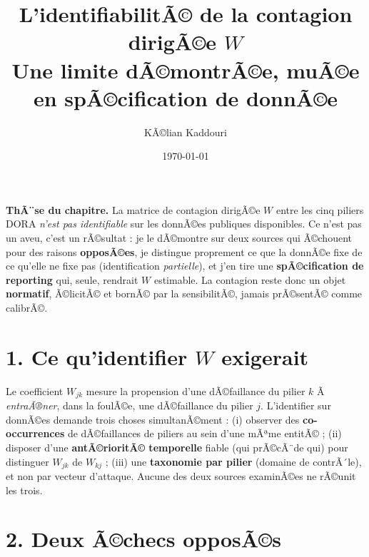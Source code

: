 ﻿\documentclass[11pt,a4paper]{article}
\title{\vspace{-1.3cm}\color{navy}\bfseries L'identifiabilitÃ© de la contagion dirigÃ©e $W$\\[2pt]
  \large Une limite dÃ©montrÃ©e, muÃ©e en spÃ©cification de donnÃ©e}
\author{KÃ©lian Kaddouri}
\date{\today}
\begin{document}
\maketitle
\vspace{-0.7cm}

\begin{cle}
\textbf{ThÃ¨se du chapitre.} La matrice de contagion dirigÃ©e $W$ entre les cinq piliers DORA
\emph{n'est pas identifiable} sur les donnÃ©es publiques disponibles. Ce n'est pas un aveu,
c'est un rÃ©sultat : je le dÃ©montre sur deux sources qui Ã©chouent pour des raisons
\textbf{opposÃ©es}, je distingue proprement ce que la donnÃ©e fixe de ce qu'elle ne fixe pas
(identification \emph{partielle}), et j'en tire une \textbf{spÃ©cification de reporting}
qui, seule, rendrait $W$ estimable. La contagion reste donc un objet \textbf{normatif},
Ã©licitÃ© et bornÃ© par la sensibilitÃ©, jamais prÃ©sentÃ© comme calibrÃ©.
\end{cle}

\section*{1. Ce qu'identifier $W$ exigerait}

Le coefficient $W_{jk}$ mesure la propension d'une dÃ©faillance du pilier $k$ Ã 
\emph{entraÃ®ner}, dans la foulÃ©e, une dÃ©faillance du pilier $j$. L'identifier sur donnÃ©es
demande trois choses simultanÃ©ment : (i) observer des \textbf{co-occurrences} de
dÃ©faillances de piliers au sein d'une mÃªme entitÃ© ; (ii) disposer d'une \textbf{antÃ©rioritÃ©
temporelle} fiable (qui prÃ©cÃ¨de qui) pour distinguer $W_{jk}$ de $W_{kj}$ ; (iii) une
\textbf{taxonomie par pilier} (domaine de contrÃ´le), et non par vecteur d'attaque. Aucune
des deux sources examinÃ©es ne rÃ©unit les trois.

\section*{2. Deux Ã©checs opposÃ©s}
\end{document}
